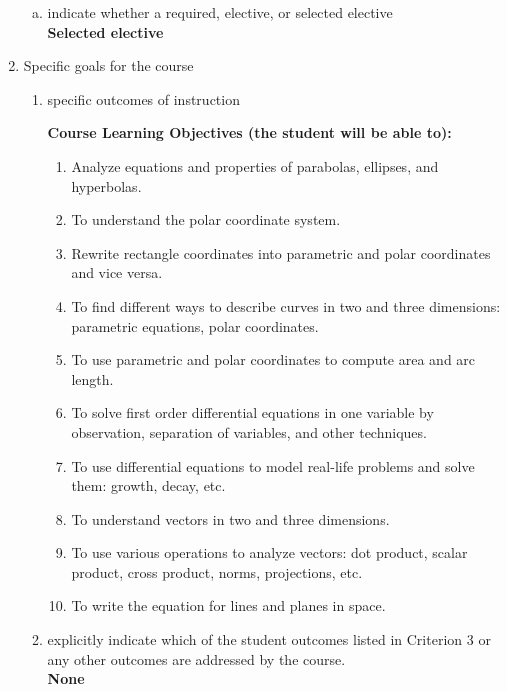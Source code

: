 \begin{enumerate}[1.]
\begin{enumerate}[a.]
\item indicate whether a required, elective, or selected elective\\ %
  {\bfseries
    Selected elective
  }

\end{enumerate}

\item Specific goals for the course
\begin{enumerate}
\item specific outcomes of instruction\\ %
  {\bfseries
    Course Learning Objectives (the student will be able to):
    \begin{enumerate}[1.]
    \item Analyze equations and properties of parabolas, ellipses, and hyperbolas.
    \item To understand the polar coordinate system.  
    \item Rewrite rectangle coordinates into parametric and polar coordinates and vice versa.
    \item To find different ways to describe curves in two and three dimensions: parametric equations, polar coordinates.
    \item To use parametric and polar coordinates to compute area and arc length.
    \item To solve first order differential equations in one variable by observation, separation of variables, and other techniques.
    \item To use differential equations to model real-life problems and solve them: growth, decay, etc.
    \item To understand vectors in two and three dimensions.
    \item To use various operations to analyze vectors: dot product, scalar product, cross product, norms, projections, etc.
    \item To write the equation for lines and planes in space.
    \end{enumerate}
  }

\item explicitly indicate which of the student outcomes listed in Criterion 3 or any other outcomes are addressed by the course.\\
  {\bfseries
    None
  }
\end{enumerate}


\end{enumerate}
